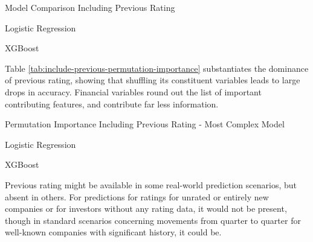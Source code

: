 \documentclass{article}[11pt]
\begin{document}
    \begin{table}[h!]
        \centering
        \caption{Model Comparison Including Previous Rating}
        \begin{minipage}[c]{0.495\linewidth}
            \centering
            
            \caption*{\footnotesize Logistic Regression} 
        \end{minipage}
        \begin{minipage}[c]{0.495\linewidth}
            \centering
            
            \caption*{\footnotesize XGBoost} 
        \end{minipage}
        \label{tab:include-previous-model-comparison}
    \end{table}

    Table \ref{tab:include-previous-permutation-importance} substantiates the dominance of previous rating, showing that shuffling its constituent variables leads to large drops in accuracy. Financial variables round out the list of important contributing features, and contribute far less information.

    \begin{table}[h!]
        \centering
        \caption{Permutation Importance Including Previous Rating - Most Complex Model}
        \begin{minipage}[c]{0.495\linewidth}
            \centering
            
            \caption*{\footnotesize Logistic Regression} 
        \end{minipage}
        \begin{minipage}[c]{0.495\linewidth}
            \centering
            
            \caption*{\footnotesize XGBoost} 
        \end{minipage}
        \label{tab:include-previous-permutation-importance}
    \end{table}

    Previous rating might be available in some real-world prediction scenarios, but absent in others. For predictions for ratings for unrated or entirely new companies or for investors without any rating data, it would not be present, though in standard scenarios concerning movements from quarter to quarter for well-known companies with significant history, it could be.
\end{document}
